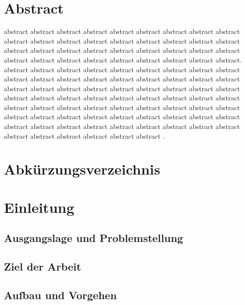 \documentclass[11pt,a4paper,titlepage]{scrartcl}
\begin{document}
\section*{Abstract}
\normalsize
abstract abstract abstract abstract abstract abstract abstract abstract abstract abstract abstract abstract abstract abstract abstract abstract abstract abstract abstract abstract abstract abstract abstract abstract abstract abstract abstract abstract abstract abstract abstract abstract abstract abstract abstract abstract. abstract abstract abstract abstract abstract abstract abstract abstract abstract abstract abstract abstract abstract abstract abstract abstract abstract abstract abstract abstract abstract abstract abstract abstract abstract abstract abstract abstract abstract abstract abstract abstract abstract abstract abstract abstract abstract abstract abstract abstract abstract abstract abstract abstract abstract abstract abstract abstract abstract abstract abstract abstract abstract abstract abstract abstract abstract abstract abstract abstract abstract abstract abstract abstract abstract abstract abstract abstract abstract .

\newpage





\tableofcontents

\newpage

\listoffigures

\newpage

\listoftables

\newpage
\section*{Abkürzungsverzeichnis}

\newpage


\section{Einleitung \label{sect:Introduction}}
\subsection{Ausgangslage und Problemstellung}
\subsection{Ziel der Arbeit}
\subsection{Aufbau und Vorgehen}
\end{document}
